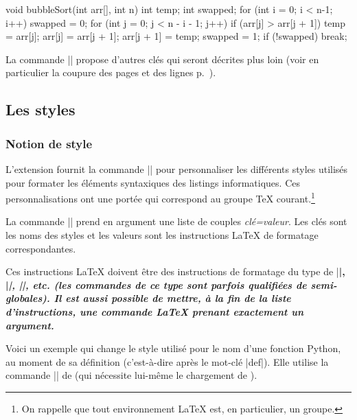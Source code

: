 \documentclass[dvipsnames,svgnames]{article}
\begin{document}
\begin{Piton}[language=C,line-numbers,gobble,
  background-color = gray!15,rounded-corners,width=min]
    void bubbleSort(int arr[], int n) {
        int temp;
        int swapped;
        for (int i = 0; i < n-1; i++) {
            swapped = 0;
            for (int j = 0; j < n - i - 1; j++) {
                if (arr[j] > arr[j + 1]) {
                    temp = arr[j];
                    arr[j] = arr[j + 1];
                    arr[j + 1] = temp;
                    swapped = 1; 
                }
            }
            if (!swapped) break;
        }
    }   
\end{Piton}


\bigskip
La commande |\PitonOptions| propose d'autres clés qui seront décrites plus loin (voir en
particulier la coupure des pages et des lignes p.~\pageref{breakable}).



\subsection{Les styles}

\label{styles}

\subsubsection{Notion de style}

L'extension  fournit la commande |\SetPitonStyle| pour personnaliser les
différents styles utilisés pour formater les éléments syntaxiques des listings
informatiques. Ces personnalisations ont une portée qui correspond au groupe TeX
courant.\footnote{On rappelle que tout environnement LaTeX est, en particulier, un
  groupe.}

\bigskip
{} La commande |\SetPitonStyle| prend en argument une liste de
couples \textsl{clé=valeur}. Les clés sont les noms des styles et les valeurs sont les
instructions LaTeX de formatage correspondantes.

\bigskip
Ces instructions LaTeX doivent être des instructions de formatage du type de |\bfseries|,
|\slshape|, |\color{...}|, etc. (les commandes de ce type sont parfois
qualifiées de \emph{semi-globales}). Il est aussi possible de mettre, \emph{à la fin de la liste
  d'instructions}, une commande LaTeX prenant exactement un argument.

\bigskip
Voici un exemple qui change le style utilisé pour le nom d'une fonction Python, au moment
de sa définition (c'est-à-dire après le mot-clé |def|). Elle utilise la commande
|\highLight| de  (qui nécessite lui-même le chargement de ).
\end{document}
